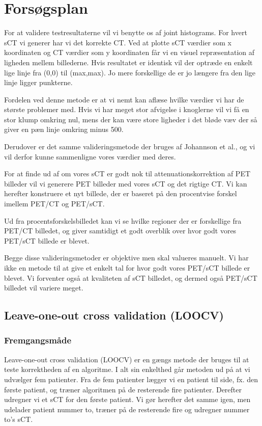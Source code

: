 \section{Forsøgsplan}

For at validere testresultaterne vil vi benytte os af joint histograms. For hvert sCT vi generer har vi det korrekte CT. Ved at plotte sCT værdier som x koordinaten og CT værdier som y koordinaten får vi en visuel repræsentation af ligheden mellem billederne. Hvis resultatet er identisk vil der optræde en enkelt lige linje fra (0,0) til (max,max). Jo mere forskellige de er jo længere fra den lige linje ligger punkterne.

Fordelen ved denne metode er at vi nemt kan aflæse hvilke værdier vi har de største problemer med. Hvis vi har meget stor afvigelse i knoglerne vil vi få en stor klump omkring nul, mens der kan være store ligheder i det bløde væv der så giver en pæn linje omkring minus 500.

Derudover er det samme valideringsmetode der bruges af Johannson et al., og vi vil derfor kunne sammenligne vores værdier med deres.

For at finde ud af om vores sCT er godt nok til attenuationskorrektion af PET billeder vil vi generere PET billeder med vores sCT og det rigtige CT. Vi kan herefter konstruere et nyt billede, der er baseret på den procentvise forskel imellem PET/CT og PET/sCT. 

Ud fra procentsforskelsbilledet kan vi se hvilke regioner der er forskellige fra PET/CT billedet, og giver samtidigt et godt overblik over hvor godt vores PET/sCT billede er blevet.

Begge disse valideringsmetoder er objektive men skal valueres manuelt. Vi har ikke en metode til at give et enkelt tal for hvor godt vores PET/sCT billede er blevet. Vi forventer også at kvaliteten af sCT billedet, og dermed også PET/sCT billedet vil variere meget.


\subsection{Leave-one-out cross validation (LOOCV)}
\subsubsection{Fremgangsmåde}
Leave-one-out cross validation (LOOCV) er en gængs metode der bruges til at teste korrektheden af en algoritme. I alt sin enkelthed går metoden ud på at vi udvælger fem patienter. Fra de fem patienter lægger vi en patient til side, fx. den første patient, og træner algoritmen på de resterende fire patienter. Derefter udregner vi et sCT for den første patient. Vi gør herefter det samme igen, men udelader patient nummer to, træner på de resterende fire og udregner nummer to's sCT. 

